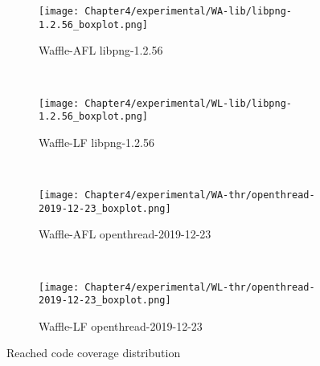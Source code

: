 \begin{figure}[!t]
    \begin{adjustbox}{center,max width=1.3\textwidth}
        \begin{subfigure}[t]{0.5\textwidth}
            \centering
            \texttt{[image: Chapter4/experimental/WA-lib/libpng-1.2.56\_boxplot.png]}
            \vspace*{-5mm}
            \caption{Waffle-AFL libpng-1.2.56}
            \label{box:wal}
            \vspace*{5mm}
        \end{subfigure}
        ~
        \begin{subfigure}[t]{0.5\textwidth}
            \centering
            \texttt{[image: Chapter4/experimental/WL-lib/libpng-1.2.56\_boxplot.png]}
            \vspace*{-5mm}
            \caption{Waffle-LF libpng-1.2.56}
            \label{box:wll}
            \vspace*{5mm}
        \end{subfigure}
    \end{adjustbox}
    ~
    \begin{adjustbox}{center,max width=1.3\textwidth}
        \begin{subfigure}[t]{0.5\textwidth}
            \centering
            \texttt{[image: Chapter4/experimental/WA-thr/openthread-2019-12-23\_boxplot.png]}
            \vspace*{-5mm}
            \caption{Waffle-AFL openthread-2019-12-23}
            \label{box:wao}
            \vspace*{5mm}
        \end{subfigure}
        ~
        \begin{subfigure}[t]{0.5\textwidth}
            \centering
            \texttt{[image: Chapter4/experimental/WL-thr/openthread-2019-12-23\_boxplot.png]}
            \vspace*{-5mm}
            \caption{Waffle-LF openthread-2019-12-23}
            \label{box:wlo}
            \vspace*{5mm}
        \end{subfigure}
    \end{adjustbox}
    \caption{Reached code coverage distribution}
    \label{fig:report-box}
\end{figure}

